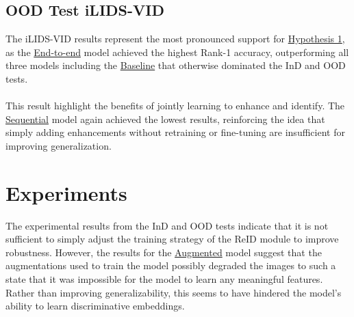 \subsection{OOD Test iLIDS-VID}

The \acs{iLIDS-VID} results represent the most pronounced support for \hyperlink{hypothesis:1}{Hypothesis 1}, as the \hyperlink{model:endtoend}{End-to-end} model achieved the highest Rank-1 accuracy, outperforming all three models including the \hyperlink{model:baseline}{Baseline} that otherwise dominated the \acs{InD} and \acs{OOD} tests. 
\\\\
This result highlight the benefits of jointly learning to enhance and identify. The \hyperlink{model:sequential}{Sequential} model again achieved the lowest results, reinforcing the idea that simply adding enhancements without retraining or fine-tuning are insufficient for improving generalization.

\section{Experiments}

The experimental results from the \acs{InD} and \acs{OOD} tests indicate that it is not sufficient to simply adjust the training strategy of the \acs{ReID} module to improve robustness. However, the results for the \hyperlink{model:augmented}{Augmented} model suggest that the augmentations used to train the model possibly degraded the images to such a state that it was impossible for the model to learn any meaningful features. Rather than improving generalizability, this seems to have hindered the model's ability to learn discriminative embeddings. 


